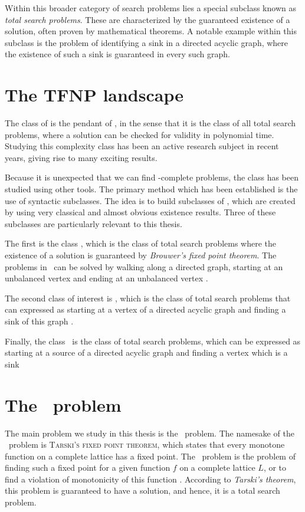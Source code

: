 Within this broader category of search problems lies a special subclass known as \emph{total search problems}. These are characterized by the guaranteed existence of a solution, often proven by mathematical theorems. A notable example within this subclass is the problem of identifying a sink in a directed acyclic graph, where the existence of such a sink is guaranteed in every such graph.

\section{The TFNP landscape}

The class of \TFNP is the pendant of \NP, in the sense that it is the class of all total search problems, where a solution can be checked for validity in polynomial time. Studying this complexity class has been an active research subject in recent years, giving rise to many exciting results.

Because it is unexpected that we can find \TFNP-complete problems, the class has been studied using other tools. The primary method which has been established is the use of syntactic subclasses. The idea is to build subclasses of \TFNP, which are created by using very classical and almost obvious existence results. Three of these subclasses are particularly relevant to this thesis.

The first is the class \PPAD, which is the class of total search problems where the existence of a solution is guaranteed by \textit{Brouwer's fixed point theorem}. The problems in \PPAD\ can be solved by walking along a directed graph, starting at an unbalanced vertex and ending at an unbalanced vertex .

The second class of interest is \PLS, which is the class of total search problems that can expressed as starting at a vertex of a directed acyclic graph and finding a sink of this graph .

Finally, the class \EOPL\ is the class of total search problems, which can be expressed as starting at a source of a directed acyclic graph and finding a vertex which is a sink 

\section{The \Tarski\ problem}

The main problem we study in this thesis is the \Tarski\ problem. The namesake of the \Tarski\ problem is \textsc{Tarski's fixed point theorem}, which states that every monotone function on a complete lattice has a fixed point. The \Tarski\ problem is the problem of finding such a fixed point for a given function $f$ on a complete lattice $L$, or to find a violation of monotonicity of this function . According to \textit{Tarski's theorem}, this problem is guaranteed to have a solution, and hence, it is a total search problem.


